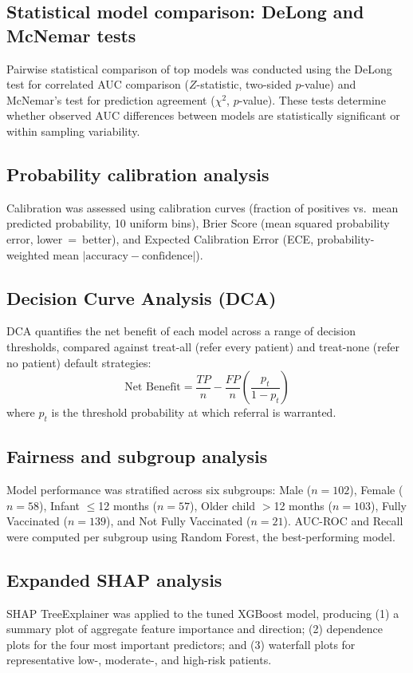 \documentclass[3p,times,twocolumn]{elsarticle}
\begin{document}
\subsection{Statistical model comparison: DeLong and McNemar tests}
Pairwise statistical comparison of top models was conducted using the DeLong test \cite{ref16} for correlated AUC comparison ($Z$-statistic, two-sided $p$-value) and McNemar's test for prediction agreement ($\chi^2$, $p$-value). These tests determine whether observed AUC differences between models are statistically significant or within sampling variability.

\subsection{Probability calibration analysis}
Calibration was assessed using calibration curves (fraction of positives vs.\ mean predicted probability, 10 uniform bins), Brier Score (mean squared probability error, lower~=~better), and Expected Calibration Error (ECE, probability-weighted mean $|\text{accuracy} - \text{confidence}|$).

\subsection{Decision Curve Analysis (DCA)}
DCA quantifies the net benefit of each model across a range of decision thresholds, compared against treat-all (refer every patient) and treat-none (refer no patient) default strategies:
\begin{equation}
\text{Net Benefit} = \frac{TP}{n} - \frac{FP}{n}\left(\frac{p_t}{1-p_t}\right)
\end{equation}
where $p_t$ is the threshold probability at which referral is warranted.

\subsection{Fairness and subgroup analysis}
Model performance was stratified across six subgroups: Male ($n=102$), Female ($n=58$), Infant $\leq$12 months ($n=57$), Older child $>$12 months ($n=103$), Fully Vaccinated ($n=139$), and Not Fully Vaccinated ($n=21$). AUC-ROC and Recall were computed per subgroup using Random Forest, the best-performing model.

\subsection{Expanded SHAP analysis}
SHAP TreeExplainer was applied to the tuned XGBoost model, producing (1) a summary plot of aggregate feature importance and direction; (2) dependence plots for the four most important predictors; and (3) waterfall plots for representative low-, moderate-, and high-risk patients.
\end{document}
